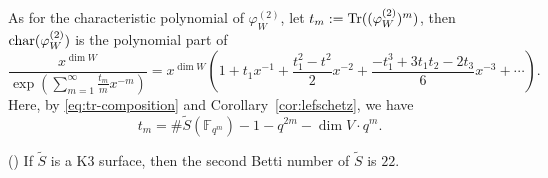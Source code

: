 \documentclass[main]{subfiles}
\begin{document}
As for the characteristic polynomial of $\varphi^{(2)}_{W}$, let $t_{m} := \operatorname{Tr}((\varphi^{(2)}_{W})^{m})$, then $\operatorname{char} (\varphi^{(2)}_{W})$ is the polynomial part of
\begin{equation}
    \frac{x^{\dim W}}{\exp \left( \sum_{m = 1}^{\infty} \frac{t_{m}}{m} x^{-m} \right)} = x^{\dim W}\left( 1 + t_{1} x^{-1} + \frac{t_{1}^{2} - t^{2}}{2} x^{-2} + \frac{-t_{1}^{3} + 3 t_{1} t_{2} - 2 t_{3}}{6} x^{-3} + \cdots\right).
\end{equation}
Here, by \eqref{eq:tr-composition} and Corollary~\ref{cor:lefschetz}, we have
\begin{equation}
    t_{m} = \# \tilde{S}(\mathbb{F}_{q^{m}}) - 1 - q^{2m} - \dim V \cdot q^{m}.
\end{equation}

\begin{lem}{(\cite[Theorem 4, Part III]{ref:mumford2004})}
    \label{lem:k3-betti}
    If $\tilde{S}$ is a K3 surface, then the second Betti number of $\tilde{S}$ is $22$.
\end{lem}
\end{document}

